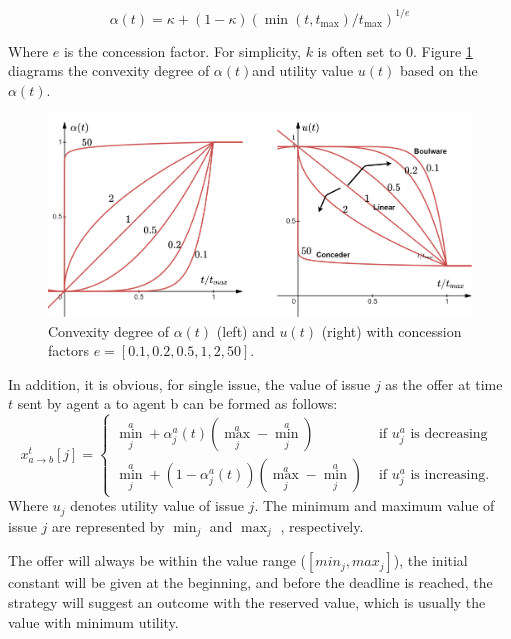 \begin{equation}
\alpha(t)=\kappa+\left(1-\kappa\right)\left(\min \left(t, t_{\max }\right) / t_{\max }\right)^{1 / e}
\end{equation}

Where $e$ is the concession factor. For simplicity, $k$ is often set to $0$. Figure \ref{fig:boulware-conceder-combination} diagrams the convexity degree of $\alpha(t)$and utility value $u(t)$ based on the $\alpha(t)$.

\begin{figure}
\centering
\includegraphics[width=1.0\textwidth]{./images/conceder-boulware-combination.png}
\caption{Convexity degree of $\alpha(t)$ (left) and $u(t)$ (right) with concession factors $e=[0.1, 0.2, 0.5, 1, 2, 50]$.}
\label{fig:boulware-conceder-combination}
\end{figure}

In addition, it is obvious, for single issue, the value of issue $j$ as the offer at time $t$ sent by agent a to agent b can be formed as follows:
\begin{equation}
x_{a \rightarrow b}^{t}[j]=\left\{\begin{array}{ll}
\min _{j}^{a}+\alpha_{j}^{a}(t)\left(\max _{j}^{a}-\min _{j}^{a}\right) & \text { if } u_{j}^{a} \text { is decreasing } \\
\min _{j}^{a}+\left(1-\alpha_{j}^{a}(t)\right)\left(\max _{j}^{a}-\min _{j}^{a}\right) & \text { if } u_{j}^{a} \text { is increasing. }
\end{array}\right.
\end{equation}
Where $u_{j}$ denotes utility value of issue $j$. The minimum and maximum value of issue $j$ are represented by $\min _{j}$ and $\max _{j}$ , respectively.

The offer will always be within the value range ($[min_j, max_j]$), the initial constant will be given at the beginning, and before the deadline is reached, the strategy will suggest an outcome with the reserved value, which is usually the value with minimum utility.

